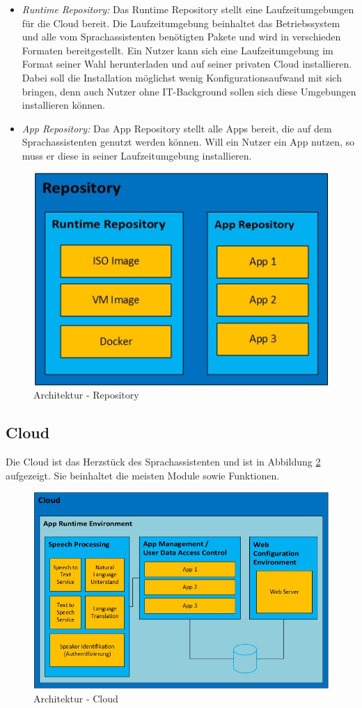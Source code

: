 \begin{itemize}
	\item \textsl{Runtime Repository:} Das Runtime Repository stellt eine Laufzeitumgebungen für die Cloud bereit. Die Laufzeitumgebung beinhaltet das Betriebssystem und alle vom Sprachassistenten benötigten Pakete und wird in verschieden Formaten bereitgestellt. Ein Nutzer kann sich eine Laufzeitumgebung im Format seiner Wahl herunterladen und auf seiner privaten Cloud installieren. Dabei soll die Installation möglichst wenig Konfigurationsaufwand mit sich bringen, denn auch Nutzer ohne IT-Background sollen sich diese Umgebungen installieren können. 
	\item \textsl{App Repository:} Das App Repository stellt alle Apps bereit, die auf dem Sprachassistenten genutzt werden können. Will ein Nutzer ein App nutzen, so muss er diese in seiner Laufzeitumgebung installieren.
\end{itemize}


\begin{figure}[h!]
	\centering
	\includegraphics[width=0.6\linewidth]{Picture/Infrastruktur-Repository.jpg}
	\caption[Architektur - mobile App]{Architektur - Repository}
	\label{fig:infrastruktur-repository}
\end{figure}

\subsection{Cloud}
Die Cloud ist das Herzstück des Sprachassistenten und ist in Abbildung \ref{fig:infrastruktur-cloud} aufgezeigt. Sie beinhaltet die meisten Module sowie Funktionen.

\begin{figure}[h!]
	\centering
	\includegraphics[width=0.9\linewidth]{Picture/Infrastruktur-Cloud.jpg}
	\caption[Architektur - mobile App]{Architektur - Cloud}
	\label{fig:infrastruktur-cloud}
\end{figure}

